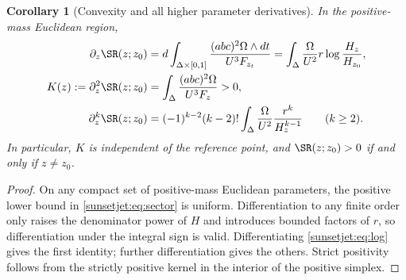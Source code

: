 \documentclass[11pt,a4paper,oneside]{article}
\theoremstyle{plain}
\newtheorem{corollary}[theorem]{Corollary}
\theoremstyle{definition}
\theoremstyle{remark}
\numberwithin{equation}{section}
\begin{document}
\begin{corollary}[Convexity and all higher parameter derivatives]\label{sunsetjet:cor:derivatives}
In the positive-mass Euclidean region,
\begin{align}
 \partial_z\SR(z;z_0)
 &=d\int_{\Delta\times[0,1]}
             \frac{(abc)^2\Omega\wedge dt}{U^3F_{z_t}}
   =\int_\Delta\frac{\Omega}{U^2}r\log\frac{H_z}{H_{z_0}},\label{sunsetjet:eq:first}\\
 K(z):=\partial_z^2\SR(z;z_0)
 &=\int_\Delta\frac{(abc)^2\Omega}{U^3F_z}>0,\label{sunsetjet:eq:second}\\
 \partial_z^k\SR(z;z_0)
 &=(-1)^{k-2}(k-2)!
       \int_\Delta\frac{\Omega}{U^2}\frac{r^k}{H_z^{k-1}}\qquad(k\geq2).
                                                        \label{sunsetjet:eq:higher}
\end{align}
In particular, $K$ is independent of the reference point, and $\SR(z;z_0)>0$ if and only if $z\ne z_0$.
\end{corollary}
\begin{proof}
On any compact set of positive-mass Euclidean parameters, the positive lower bound in \eqref{sunsetjet:eq:sector} is uniform.
Differentiation to any finite order only raises the denominator power of $H$ and introduces bounded factors of $r$,
so differentiation under the integral sign is valid.
Differentiating \eqref{sunsetjet:eq:log} gives the first identity; further differentiation gives the others.
Strict positivity follows from the strictly positive kernel in the interior of the positive simplex.
\end{proof}
\end{document}
